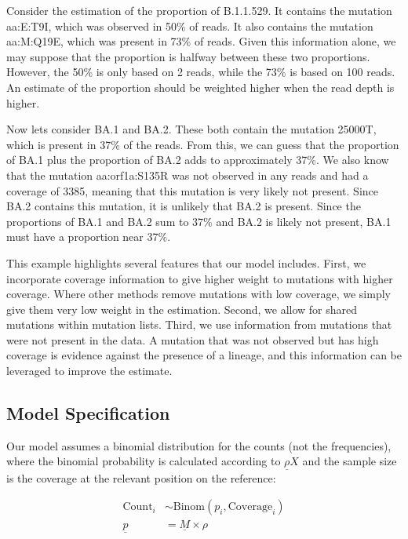 \documentclass{article}
\begin{document}
Consider the estimation of the proportion of B.1.1.529.
It contains the mutation aa:E:T9I, which was observed in 50\% of reads.
It also contains the mutation aa:M:Q19E, which was present in 73\% of reads.
Given this information alone, we may suppose that the proportion is halfway between these two proportions.
However, the 50\% is only based on 2 reads, while the 73\% is based on 100 reads.
An estimate of the proportion should be weighted higher when the read depth is higher.

Now lets consider BA.1 and BA.2.
These both contain the mutation 25000T, which is present in 37\% of the reads.
From this, we can guess that the proportion of BA.1 plus the proportion of BA.2 adds to approximately 37\%.
We also know that the mutation aa:orf1a:S135R was not observed in any reads and had a coverage of 3385, meaning that this mutation is very likely not present.
Since BA.2 contains this mutation, it is unlikely that BA.2 is present.
Since the proportions of BA.1 and BA.2 sum to 37\% and BA.2 is likely not present, BA.1 must have a proportion near 37\%.

This example highlights several features that our model includes.
First, we incorporate coverage information to give higher weight to mutations with higher coverage.
Where other methods remove mutations with low coverage, we simply give them very low weight in the estimation.
Second, we allow for shared mutations within mutation lists.
Third, we use information from mutations that were not present in the data.
A mutation that was not observed but has high coverage is evidence against the presence of a lineage, and this information can be leveraged to improve the estimate.




\subsection{Model Specification}

Our model assumes a binomial distribution for the counts (not the frequencies), where the binomial probability is calculated according to $\underline \rho X$ and the sample size is the coverage at the relevant position on the reference:

$$
\begin{aligned}
\text{Count}_i &\sim \text{Binom}(p_i, \text{Coverage}_i)\\
\underline p &= \underline M \times \rho
\end{aligned}
$$
\end{document}
